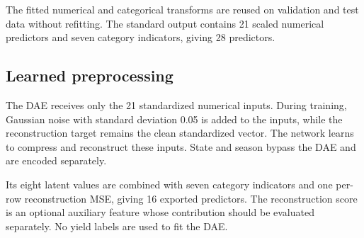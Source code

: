 \documentclass[11pt,a4paper]{article}
\begin{document}
The fitted numerical and categorical transforms are reused on validation and test data without refitting. The standard output contains 21 scaled numerical predictors and seven category indicators, giving 28 predictors.

\subsection*{Learned preprocessing}
The DAE receives only the 21 standardized numerical inputs. During training, Gaussian noise with standard deviation 0.05 is added to the inputs, while the reconstruction target remains the clean standardized vector. The network learns to compress and reconstruct these inputs. State and season bypass the DAE and are encoded separately.

Its eight latent values are combined with seven category indicators and one per-row reconstruction MSE, giving 16 exported predictors. The reconstruction score is an optional auxiliary feature whose contribution should be evaluated separately. No yield labels are used to fit the DAE.
\end{document}
